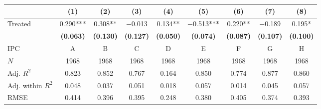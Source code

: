 
\begin{tabular}[t]{lcccccccc}
\toprule
  & (1) & (2) & (3) & (4) & (5) & (6) & (7) & (8)\\
\midrule
Treated & \num{0.290}*** & \num{0.308}** & \num{-0.013} & \num{0.134}** & \num{-0.513}*** & \num{0.220}** & \num{-0.189} & \num{0.195}*\\
\textbf{} & \textbf{(\num{0.063})} & \textbf{(\num{0.130})} & \textbf{(\num{0.127})} & \textbf{(\num{0.050})} & \textbf{(\num{0.074})} & \textbf{(\num{0.087})} & \textbf{(\num{0.107})} & \textbf{(\num{0.100})}\\
\midrule
IPC & A & B & C & D & E & F & G & H\\
$N$ & \num{1968} & \num{1968} & \num{1968} & \num{1968} & \num{1968} & \num{1968} & \num{1968} & \num{1968}\\
Adj. $R^2$ & \num{0.823} & \num{0.852} & \num{0.767} & \num{0.164} & \num{0.850} & \num{0.774} & \num{0.877} & \num{0.860}\\
Adj. within $R^2$ & \num{0.048} & \num{0.037} & \num{0.051} & \num{0.018} & \num{0.057} & \num{0.014} & \num{0.045} & \num{0.057}\\
RMSE & \num{0.414} & \num{0.396} & \num{0.395} & \num{0.248} & \num{0.380} & \num{0.405} & \num{0.374} & \num{0.393}\\
\bottomrule
\end{tabular}
